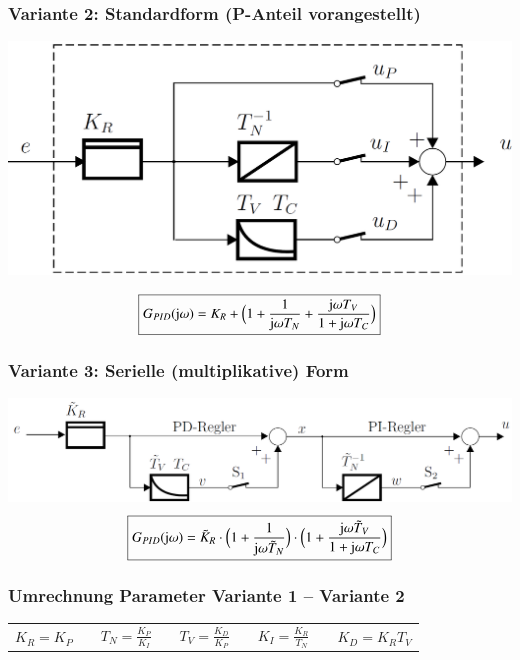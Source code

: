 \subsubsection{Variante 2: Standardform (P-Anteil vorangestellt)}

\begin{minipage}[c]{0.4\columnwidth}
    \includegraphics[width=\columnwidth]{images/pid_regler_aufbau_standardform.png}
\end{minipage}
\hfill
\begin{minipage}[c]{0.55\columnwidth}
    $$ \boxed{ G_{PID}(\mathrm{j} \omega) = K_R + \Big( 1 + \frac{1}{\mathrm{j} \omega T_N} +\frac{\mathrm{j} \omega T_V}{1 + \mathrm{j} \omega T_C} \Big) } $$
\end{minipage}


\subsubsection{Variante 3: Serielle (multiplikative) Form}
\label{PID-Regler multiplikativ}

    \includegraphics[width=0.8\columnwidth]{images/pid_regler_aufbau_serielle_form.png}
    $$ \boxed{ G_{PID}(\mathrm{j} \omega) = \tilde{K}_R \cdot \Big( 1 + \frac{1}{\mathrm{j} \omega \tilde{T}_N} \Big) \cdot \Big(1 + \frac{\mathrm{j} \omega \tilde{T}_V}{1 + \mathrm{j} \omega T_C} \Big) } $$

\subsubsection{Umrechnung Parameter Variante 1 -- Variante 2}

\begin{tabular}{c c c c c c c c c}
    $K_R = K_P$ & & $T_N = \frac{K_P}{K_I}$ & & $T_V = \frac{K_D}{K_P}$ & & $K_I = \frac{K_R}{T_N}$ & & $ K_D = K_R T_V$
\end{tabular}

